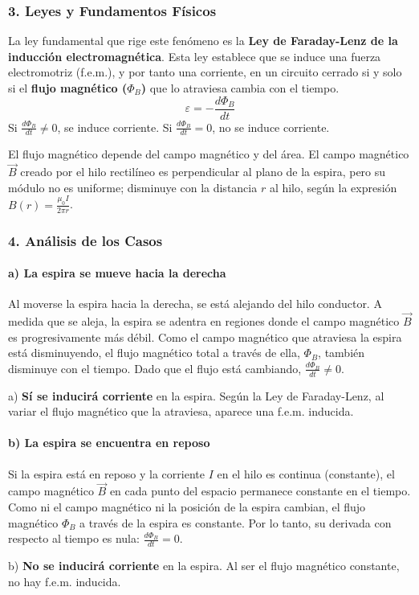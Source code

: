 \subsubsection*{3. Leyes y Fundamentos Físicos}
La ley fundamental que rige este fenómeno es la \textbf{Ley de Faraday-Lenz de la inducción electromagnética}. Esta ley establece que se induce una fuerza electromotriz (f.e.m.), y por tanto una corriente, en un circuito cerrado si y solo si el \textbf{flujo magnético ($\Phi_B$)} que lo atraviesa cambia con el tiempo.
$$ \varepsilon = - \frac{d\Phi_B}{dt} $$
Si $\frac{d\Phi_B}{dt} \neq 0$, se induce corriente. Si $\frac{d\Phi_B}{dt} = 0$, no se induce corriente.

El flujo magnético depende del campo magnético y del área. El campo magnético $\vec{B}$ creado por el hilo rectilíneo es perpendicular al plano de la espira, pero su módulo no es uniforme; disminuye con la distancia $r$ al hilo, según la expresión $B(r) = \frac{\mu_0 I}{2\pi r}$.

\subsubsection*{4. Análisis de los Casos}
\paragraph{a) La espira se mueve hacia la derecha}
Al moverse la espira hacia la derecha, se está alejando del hilo conductor. A medida que se aleja, la espira se adentra en regiones donde el campo magnético $\vec{B}$ es progresivamente más débil.
Como el campo magnético que atraviesa la espira está disminuyendo, el flujo magnético total a través de ella, $\Phi_B$, también disminuye con el tiempo.
Dado que el flujo está cambiando, $\frac{d\Phi_B}{dt} \neq 0$.
\begin{cajaresultado}
    a) \textbf{Sí se inducirá corriente} en la espira. Según la Ley de Faraday-Lenz, al variar el flujo magnético que la atraviesa, aparece una f.e.m. inducida.
\end{cajaresultado}

\paragraph{b) La espira se encuentra en reposo}
Si la espira está en reposo y la corriente $I$ en el hilo es continua (constante), el campo magnético $\vec{B}$ en cada punto del espacio permanece constante en el tiempo.
Como ni el campo magnético ni la posición de la espira cambian, el flujo magnético $\Phi_B$ a través de la espira es constante.
Por lo tanto, su derivada con respecto al tiempo es nula: $\frac{d\Phi_B}{dt} = 0$.
\begin{cajaresultado}
    b) \textbf{No se inducirá corriente} en la espira. Al ser el flujo magnético constante, no hay f.e.m. inducida.
\end{cajaresultado}

